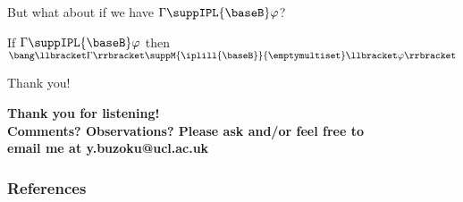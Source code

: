 \documentclass{beamer}
\begin{document}
\begin{frame}
	\begin{center}
		But what about if we have $\Gamma\suppIPL{\baseB}\varphi$?
		\vspace{1cm}
		\pause
		\begin{theorem}
			If $\Gamma\suppIPL{\baseB}\varphi$ then $\bang\llbracket\Gamma\rrbracket\suppM{\iplill{\baseB}}{\emptymultiset}\llbracket\varphi\rrbracket$
		\end{theorem}
	\end{center}
\end{frame}

\begin{frame}{Thank you!}
	\begin{center}
		\textbf{Thank you for listening! \\ 
		Comments? Observations? Please ask and/or feel free to \\
		email me at y.buzoku@ucl.ac.uk}
	\end{center}
\end{frame}
\begin{frame}[allowframebreaks]
	\frametitle{References}
	\nocite{*}
	
	
\end{frame}
\end{document}
